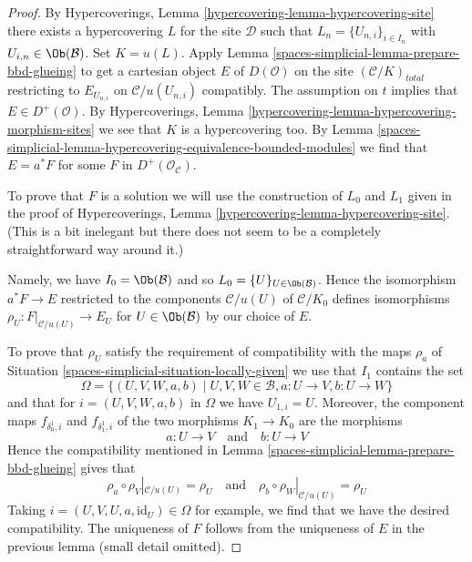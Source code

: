 \begin{proof}
By Hypercoverings, Lemma \ref{hypercovering-lemma-hypercovering-site}
there exists a hypercovering $L$ for the site $\mathcal{D}$ such that
$L_n = \{U_{n, i}\}_{i \in I_n}$ with $U_{i, n} \in \Ob(\mathcal{B})$.
Set $K = u(L)$. Apply Lemma \ref{spaces-simplicial-lemma-prepare-bbd-glueing}
to get a cartesian object $E$ of $D(\mathcal{O})$ on the site
$(\mathcal{C}/K)_{total}$ restricting to $E_{U_{n, i}}$ on
$\mathcal{C}/u(U_{n, i})$ compatibly.
The assumption on $t$ implies that $E \in D^+(\mathcal{O})$.
By Hypercoverings, Lemma \ref{hypercovering-lemma-hypercovering-morphism-sites}
we see that $K$ is a hypercovering too.
By Lemma \ref{spaces-simplicial-lemma-hypercovering-equivalence-bounded-modules}
we find that $E = a^*F$ for some $F$ in $D^+(\mathcal{O}_\mathcal{C})$.

\medskip\noindent
To prove that $F$ is a solution we will use the construction of
$L_0$ and $L_1$ given in the proof of
Hypercoverings, Lemma \ref{hypercovering-lemma-hypercovering-site}.
(This is a bit inelegant but there does not seem to be a completely
straightforward way around it.)

\medskip\noindent
Namely, we have $I_0 = \Ob(\mathcal{B})$ and so
$L_0 = \{U\}_{U \in \Ob(\mathcal{B})}$.
Hence the isomorphism $a^*F \to E$ restricted to the components
$\mathcal{C}/u(U)$ of $\mathcal{C}/K_0$ defines isomorphisms
$\rho_U : F|_{\mathcal{C}/u(U)} \to E_U$ for $U \in \Ob(\mathcal{B})$
by our choice of $E$.

\medskip\noindent
To prove that $\rho_U$ satisfy the requirement of compatibility
with the maps $\rho_a$ of Situation \ref{spaces-simplicial-situation-locally-given}
we use that $I_1$ contains the set
$$
\Omega =
\{(U, V, W, a, b) \mid U, V, W \in \mathcal{B}, a : U \to V, b : U \to W\}
$$
and that for $i = (U, V, W, a, b)$ in $\Omega$ we have
$U_{1, i} = U$. Moreover, the component maps $f_{\delta^1_0, i}$ and
$f_{\delta^1_1, i}$ of the two morphisms $K_1 \to K_0$ are the morphisms
$$
a : U \to V \quad\text{and}\quad b : U \to V
$$
Hence the compatibility mentioned in
Lemma \ref{spaces-simplicial-lemma-prepare-bbd-glueing} gives that
$$
\rho_a \circ \rho_V|_{\mathcal{C}/u(U)} = \rho_U
\quad\text{and}\quad
\rho_b \circ \rho_W|_{\mathcal{C}/u(U)} = \rho_U
$$
Taking $i = (U, V, U, a, \text{id}_U) \in \Omega$ for example, we find
that we have the desired compatibility. The uniqueness of $F$ follows
from the uniqueness of $E$ in the previous lemma (small detail omitted).
\end{proof}

